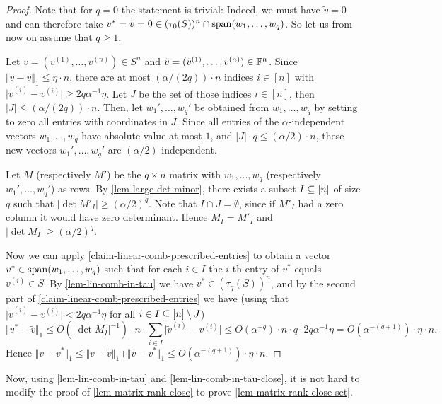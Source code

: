 \documentclass{daj}
\theoremstyle{plain}
\theoremstyle{plain}
\theoremstyle{plain}
\theoremstyle{plain}
\theoremstyle{definition}
\theoremstyle{plain}
\theoremstyle{plain}
\theoremstyle{definition}
\theoremstyle{definition}
\theoremstyle{plain}
\begin{document}
\begin{proof}
Note that for $q=0$ the statement is trivial: Indeed, we must have $\tilde{v}=0$ and can therefore take $v^*=\tilde{v}=0\in (\tau_{0}(S))^n\cap \operatorname{span}(w_1,\dots,w_q)$. So let us from now on assume that $q\geq 1$.

Let $v=(v^{(1)},\dots, v^{(n)})\in S^n$ and $\tilde{v}=(\tilde{v}^{(1)},\dots, \tilde{v}^{(n)})\in \mathbb{F}^n$. Since $\Vert v-\tilde{v}\Vert_1\leq \eta\cdot n$, there are at most $(\alpha/(2q))\cdot n$ indices $i\in [n]$ with $\vert \tilde{v}^{(i)}-v^{(i)}\vert\geq 2q\alpha^{-1}\eta$. Let $J$ be the set of those indices $i\in [n]$, then $\vert J\vert\leq (\alpha/(2q))\cdot n$. Then, let $w_1',\dots,w_q'$ be obtained from $w_1,\dots,w_q$ by setting to zero all entries with coordinates in $J$. Since all entries of the $\alpha$-independent vectors $w_1,\dots,w_q$ have absolute value at most $1$, and $\vert J\vert\cdot q\le (\alpha/2) \cdot n$, these new vectors $w_1',\dots,w_q'$ are $(\alpha/2)$-independent.

Let $M$ (respectively $M'$) be the $q\times n$ matrix with $w_1,\dots,w_q$ (respectively $w_1',\dots,w_q'$) as rows. By \cref{lem-large-det-minor}, there exists a subset $I\subseteq [n]$ of size $q$ such that $|\det M'_I|\ge (\alpha/2)^q$. Note that $I\cap J=\emptyset$, since if $M'_I$ had a zero column it would have zero determinant. Hence $M_I=M'_I$ and $|\det M_I|\ge (\alpha/2)^q$.

Now we can apply \cref{claim-linear-comb-prescribed-entries} to obtain a vector $v^*\in \operatorname{span}(w_1,\dots,w_q)$ such that for each $i\in I$ the $i$-th entry of $v^*$ equals $v^{(i)}\in S$. By \cref{lem-lin-comb-in-tau} we have $v^*\in (\tau_{q}(S))^n$, and by the second part of \cref{claim-linear-comb-prescribed-entries} we have (using that $\vert \tilde{v}^{(i)}-v^{(i)}\vert< 2q \alpha^{-1} \eta$ for all $i\in I\subseteq [n]\setminus J$)
\[\Vert v^*-\tilde{v}\Vert_1\leq  O(|\det M_I|^{-1})\cdot n\cdot \sum_{i\in I} \vert \tilde{v}^{(i)}-v^{(i)}\vert\leq O(\alpha^{-q})\cdot n\cdot q\cdot 2q\alpha^{-1}\eta =O(\alpha^{-(q+1)})\cdot \eta \cdot n.\]
Hence $\Vert v-v^*\Vert_1\leq \Vert v-\tilde{v}\Vert_1+\Vert \tilde{v}-v^*\Vert_1\leq O(\alpha^{-(q+1)})\cdot \eta \cdot n$.
\end{proof}

Now, using \cref{lem-lin-comb-in-tau} and \cref{lem-lin-comb-in-tau-close}, it is not hard to modify the proof of \cref{lem-matrix-rank-close} to prove \cref{lem-matrix-rank-close-set}.
\end{document}
